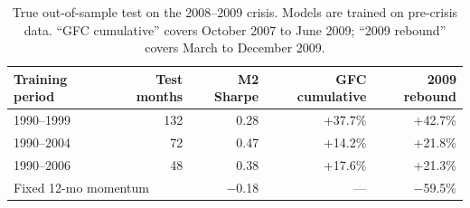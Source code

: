 \begin{table}[H]
\centering
\small
\begin{tabular}{l r r r r}
\toprule
Training period & Test months & M2 Sharpe & GFC cumulative & 2009 rebound \\
\midrule
1990--1999 & 132 & 0.28 & +37.7\% & +42.7\% \\
1990--2004 & 72 & 0.47 & +14.2\% & +21.8\% \\
1990--2006 & 48 & 0.38 & +17.6\% & +21.3\% \\
\midrule
\multicolumn{2}{l}{Fixed 12-mo momentum} & $-$0.18 & --- & $-$59.5\% \\
\bottomrule
\end{tabular}
\caption{True out-of-sample test on the 2008--2009 crisis. Models are trained on pre-crisis data. ``GFC cumulative'' covers October 2007 to June 2009; ``2009 rebound'' covers March to December 2009.}
\label{tab:gfc_oos}
\end{table}